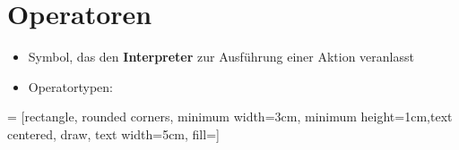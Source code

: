 
\section{Operatoren}
\begin{frame}
    \slidehead

    \begin{itemize}
        \item Symbol, das den \textbf{Interpreter} zur Ausführung einer Aktion veranlasst
        \item Operatortypen:
    \end{itemize}
     = [rectangle, rounded corners, minimum width=3cm, minimum height=1cm,text centered, draw, text width=5cm, fill=]
    \centering
\end{frame}

